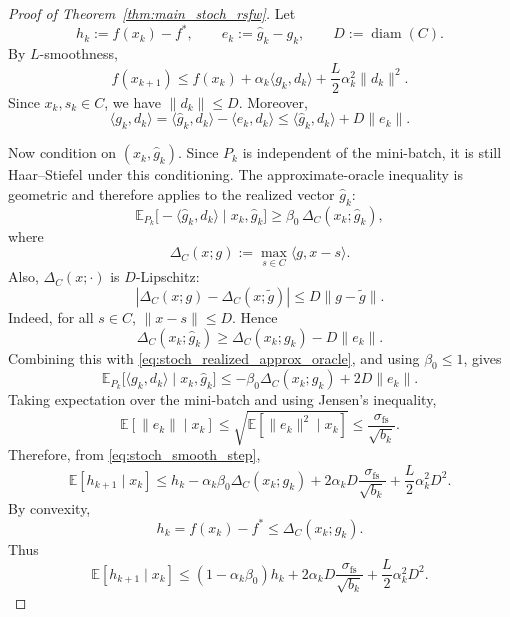 \documentclass{article}
\DeclareMathOperator{\diam}{diam}
\begin{document}
\begin{proof}[Proof of Theorem~\ref{thm:main_stoch_rsfw}]
Let
\[
h_k:=f(x_k)-f^*,
\qquad
e_k:=\widehat g_k-g_k,
\qquad
D:=\diam(C).
\]
By \(L\)-smoothness,
\begin{equation}
f(x_{k+1})
\le
f(x_k)
+
\alpha_k\langle g_k,d_k\rangle
+
\frac{L}{2}\alpha_k^2\|d_k\|^2.
\label{eq:stoch_smooth_step}
\end{equation}
Since \(x_k,s_k\in C\), we have \(\|d_k\|\le D\). Moreover,
\[
\langle g_k,d_k\rangle
=
\langle \widehat g_k,d_k\rangle
-
\langle e_k,d_k\rangle
\le
\langle \widehat g_k,d_k\rangle
+
D\|e_k\|.
\]

Now condition on \((x_k,\widehat g_k)\). Since \(P_k\) is independent of the
mini-batch, it is still Haar--Stiefel under this conditioning. The
approximate-oracle inequality is geometric and therefore applies to the
realized vector \(\widehat g_k\):
\begin{equation}
\mathbb E_{P_k}
\bigl[-\langle \widehat g_k,d_k\rangle
\mid x_k,\widehat g_k\bigr]
\ge
\beta_0\,\Delta_C(x_k;\widehat g_k),
\label{eq:stoch_realized_approx_oracle}
\end{equation}
where
\[
\Delta_C(x;g):=\max_{s\in C}\langle g,x-s\rangle .
\]
Also, \(\Delta_C(x;\cdot)\) is \(D\)-Lipschitz:
\[
|\Delta_C(x;g)-\Delta_C(x;\tilde g)|
\le
D\|g-\tilde g\|.
\]
Indeed, for all \(s\in C\), \(\|x-s\|\le D\). Hence
\[
\Delta_C(x_k;\widehat g_k)
\ge
\Delta_C(x_k;g_k)-D\|e_k\|.
\]
Combining this with \eqref{eq:stoch_realized_approx_oracle}, and using
\(\beta_0\le1\), gives
\[
\mathbb E_{P_k}
\bigl[\langle g_k,d_k\rangle
\mid x_k,\widehat g_k\bigr]
\le
-\beta_0\Delta_C(x_k;g_k)
+
2D\|e_k\|.
\]
Taking expectation over the mini-batch and using Jensen's inequality,
\[
\mathbb E[\|e_k\|\mid x_k]
\le
\sqrt{\mathbb E[\|e_k\|^2\mid x_k]}
\le
\frac{\sigma_{\mathrm{fs}}}{\sqrt{b_k}}.
\]
Therefore, from \eqref{eq:stoch_smooth_step},
\begin{equation}
\mathbb E[h_{k+1}\mid x_k]
\le
h_k
-
\alpha_k\beta_0\Delta_C(x_k;g_k)
+
2\alpha_kD\frac{\sigma_{\mathrm{fs}}}{\sqrt{b_k}}
+
\frac{L}{2}\alpha_k^2D^2.
\label{eq:stoch_one_step}
\end{equation}
By convexity,
\[
h_k=f(x_k)-f^*\le \Delta_C(x_k;g_k).
\]
Thus
\begin{equation}
\mathbb E[h_{k+1}\mid x_k]
\le
(1-\alpha_k\beta_0)h_k
+
2\alpha_kD\frac{\sigma_{\mathrm{fs}}}{\sqrt{b_k}}
+
\frac{L}{2}\alpha_k^2D^2.
\label{eq:stoch_gap_recursion_conditional}
\end{equation}


\end{proof}
\end{document}
